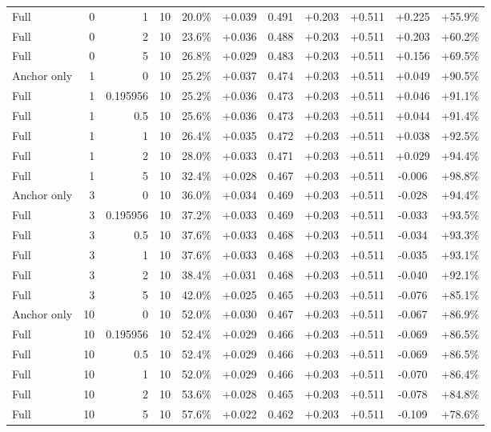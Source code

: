 \begin{table}[htbp]
\begin{tabular}{lrrrccccccc}
Full & 0 & 1 & 10 & 20.0\% & +0.039 & 0.491 & +0.203 & +0.511 & +0.225 & +55.9\% \\
Full & 0 & 2 & 10 & 23.6\% & +0.036 & 0.488 & +0.203 & +0.511 & +0.203 & +60.2\% \\
Full & 0 & 5 & 10 & 26.8\% & +0.029 & 0.483 & +0.203 & +0.511 & +0.156 & +69.5\% \\
Anchor only & 1 & 0 & 10 & 25.2\% & +0.037 & 0.474 & +0.203 & +0.511 & +0.049 & +90.5\% \\
Full & 1 & 0.195956 & 10 & 25.2\% & +0.036 & 0.473 & +0.203 & +0.511 & +0.046 & +91.1\% \\
Full & 1 & 0.5 & 10 & 25.6\% & +0.036 & 0.473 & +0.203 & +0.511 & +0.044 & +91.4\% \\
Full & 1 & 1 & 10 & 26.4\% & +0.035 & 0.472 & +0.203 & +0.511 & +0.038 & +92.5\% \\
Full & 1 & 2 & 10 & 28.0\% & +0.033 & 0.471 & +0.203 & +0.511 & +0.029 & +94.4\% \\
Full & 1 & 5 & 10 & 32.4\% & +0.028 & 0.467 & +0.203 & +0.511 & -0.006 & +98.8\% \\
Anchor only & 3 & 0 & 10 & 36.0\% & +0.034 & 0.469 & +0.203 & +0.511 & -0.028 & +94.4\% \\
Full & 3 & 0.195956 & 10 & 37.2\% & +0.033 & 0.469 & +0.203 & +0.511 & -0.033 & +93.5\% \\
Full & 3 & 0.5 & 10 & 37.6\% & +0.033 & 0.468 & +0.203 & +0.511 & -0.034 & +93.3\% \\
Full & 3 & 1 & 10 & 37.6\% & +0.033 & 0.468 & +0.203 & +0.511 & -0.035 & +93.1\% \\
Full & 3 & 2 & 10 & 38.4\% & +0.031 & 0.468 & +0.203 & +0.511 & -0.040 & +92.1\% \\
Full & 3 & 5 & 10 & 42.0\% & +0.025 & 0.465 & +0.203 & +0.511 & -0.076 & +85.1\% \\
Anchor only & 10 & 0 & 10 & 52.0\% & +0.030 & 0.467 & +0.203 & +0.511 & -0.067 & +86.9\% \\
Full & 10 & 0.195956 & 10 & 52.4\% & +0.029 & 0.466 & +0.203 & +0.511 & -0.069 & +86.5\% \\
Full & 10 & 0.5 & 10 & 52.4\% & +0.029 & 0.466 & +0.203 & +0.511 & -0.069 & +86.5\% \\
Full & 10 & 1 & 10 & 52.0\% & +0.029 & 0.466 & +0.203 & +0.511 & -0.070 & +86.4\% \\
Full & 10 & 2 & 10 & 53.6\% & +0.028 & 0.465 & +0.203 & +0.511 & -0.078 & +84.8\% \\
Full & 10 & 5 & 10 & 57.6\% & +0.022 & 0.462 & +0.203 & +0.511 & -0.109 & +78.6\% \\

\end{tabular}
\end{table}
